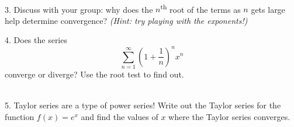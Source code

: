 \documentclass[11pt]{article}
\begin{document}
	\vspace{1em}
	\dotfill \\[1em]
	
	3. Discuss with your group: why does the $n$\textsuperscript{th} root of the terms as $n$ gets large help determine convergence? \textit{(Hint: try playing with the exponents!)}
	
	\vspace{6em}
	4. Does the series $$ \sum_{n=1}^\infty \left(1+ \frac1n \right)^n x^n$$ converge or diverge? Use the root test to find out.
	
	\vspace{10em}
	\dotfill \\[1em]
	
	5. Taylor series are a type of power series! Write out the Taylor series for the function $f(x) = e^x$ and find the values of $x$ where the Taylor series converges.

	
\end{document}
